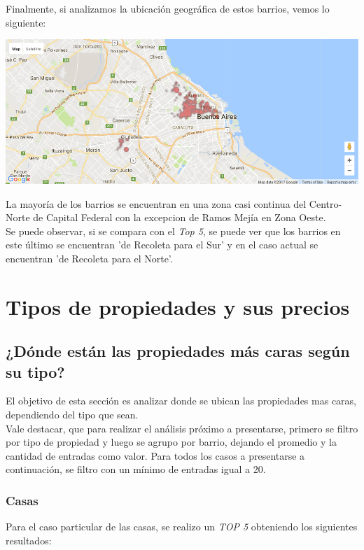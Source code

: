 \documentclass[a4paper, 10pt]{article}
\newcommand\tab[1][0.5cm]{\hspace*{#1}}
\begin{document}
            \tab Finalmente, si analizamos la ubicación geográfica de estos barrios, vemos lo siguiente:
            \begin{center}
                  \includegraphics[width=\textwidth]{images/storeSurfaceBottomMap}
            \end{center}
            \tab La mayoría de los barrios se encuentran en una zona casi continua del Centro-Norte de Capital Federal con
            la excepcion de Ramos Mejía en Zona Oeste. \\
            \tab Se puede observar, si se compara con el \emph{Top 5}, se puede ver que los barrios en este último se
            encuentran 'de Recoleta para el Sur' y en el caso actual se encuentran 'de Recoleta para el Norte'.

		\section{Tipos de propiedades y sus precios}
			\subsection{¿Dónde están las propiedades más caras según su tipo?}
				El objetivo de esta sección es analizar donde se ubican las propiedades mas caras, dependiendo del tipo que sean. \\
				Vale destacar, que para realizar el análisis próximo a presentarse, primero se filtro por tipo de propiedad y luego se agrupo por barrio, dejando el promedio y la cantidad de entradas como valor. Para todos los casos a presentarse a continuación, se filtro con un mínimo de entradas igual a 20.

				\subsubsection{Casas}
				Para el caso particular de las casas, se realizo un \emph{TOP 5} obteniendo los siguientes resultados:
\end{document}
